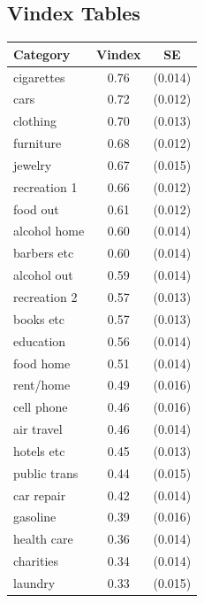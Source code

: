 \documentclass[11pt]{article}
\begin{document}
\begin{CJK}{UTF8}{gbsn}
\newpage




\newpage

\appendix

\section{Vindex Tables}
\label{sec:vin_tables}

\begin{table}[!ht]
    \centering
\begin{tabular}{lcc}
	\hline\hline
	Category & Vindex & SE \\
	\hline 
cigarettes       & 0.76 & (0.014) \\
cars             & 0.72 & (0.012) \\
clothing         & 0.70 & (0.013) \\
furniture        & 0.68 & (0.012) \\
jewelry          & 0.67 & (0.015) \\
recreation 1     & 0.66 & (0.012) \\
food out         & 0.61 & (0.012) \\
alcohol home     & 0.60 & (0.014) \\
barbers etc      & 0.60 & (0.014) \\
alcohol out      & 0.59 & (0.014) \\
recreation 2     & 0.57 & (0.013) \\
books etc        & 0.57 & (0.013) \\
education        & 0.56 & (0.014) \\
food home        & 0.51 & (0.014) \\
rent/home        & 0.49 & (0.016) \\
cell phone       & 0.46 & (0.016) \\
air travel       & 0.46 & (0.014) \\
hotels etc       & 0.45 & (0.013) \\
public trans     & 0.44 & (0.015) \\
car repair       & 0.42 & (0.014) \\
gasoline         & 0.39 & (0.016) \\
health care      & 0.36 & (0.014) \\
charities        & 0.34 & (0.014) \\
laundry          & 0.33 & (0.015) \\

\end{tabular}
\end{table}
\end{CJK}
\end{document}
